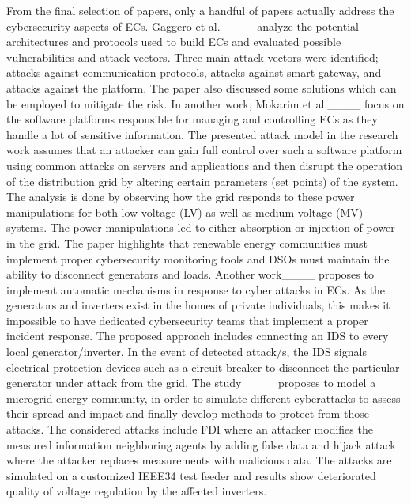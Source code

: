 From the final selection of papers, only a handful of papers actually address the cybersecurity aspects of ECs. Gaggero et al.____ analyze the potential architectures and protocols used to build ECs and evaluated possible vulnerabilities and attack vectors. Three main attack vectors were identified; attacks against communication protocols, attacks against smart gateway, and attacks against the platform. The paper also discussed some solutions which can be employed to mitigate the risk. In another work, Mokarim et al.____ focus on the software platforms responsible for managing and controlling ECs as they handle a lot of sensitive information. The presented attack model in the research work assumes that an attacker can gain full control over such a software platform using common attacks on servers and applications and then disrupt the operation of the distribution grid by altering certain parameters (set points) of the system. The analysis is done by observing how the grid responds to these power manipulations for both low-voltage (LV) as well as medium-voltage (MV) systems. The power manipulations led to either absorption or injection of power in the grid. The paper highlights that renewable energy communities must implement proper cybersecurity monitoring tools and DSOs must maintain the ability to disconnect generators and loads. Another work____ proposes to implement automatic mechanisms in response to cyber attacks in ECs. As the generators and inverters exist in the homes of private individuals, this makes it impossible to have dedicated cybersecurity teams that implement a proper incident response. The proposed approach includes connecting an IDS to every local generator/inverter. In the event of detected attack/s, the IDS signals electrical protection devices such as a circuit breaker to disconnect the particular generator under attack from the grid. The study____ proposes to model a microgrid energy community, in order to simulate different cyberattacks to assess their spread and impact and finally develop methods to protect from those attacks. The considered attacks include FDI where an attacker modifies the measured information neighboring agents by adding false data and hijack attack where the attacker replaces measurements with malicious data. The attacks are simulated on a customized IEEE34 test feeder and results show deteriorated quality of voltage regulation by the affected inverters. 

